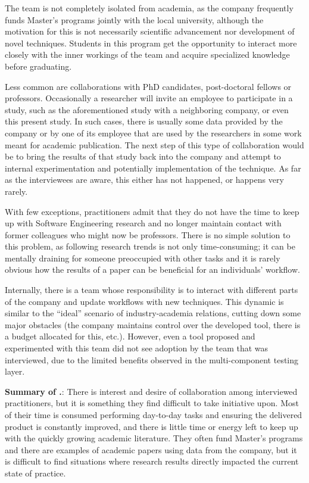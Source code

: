 The team is not completely isolated from academia, as the company frequently funds Master's programs jointly with the local university, although the motivation for this is not necessarily scientific advancement nor development of novel techniques.
Students in this program get the opportunity to interact more closely with the inner workings of the team and acquire specialized knowledge before graduating.

Less common are collaborations with PhD candidates, post-doctoral fellows or professors.
Occasionally a researcher will invite an employee to participate in a study, such as the aforementioned study with a neighboring company, or even this present study.
In such cases, there is usually some data provided by the company or by one of its employee that are used by the researchers in some work meant for academic publication.
The next step of this type of collaboration would be to bring the results of that study back into the company and attempt to internal experimentation and potentially implementation of the technique.
As far as the interviewees are aware, this either has not happened, or happens very rarely.

With few exceptions, practitioners admit that they do not have the time to keep up with Software Engineering research and no longer maintain contact with former colleagues who might now be professors.
There is no simple solution to this problem, as following research trends is not only time-consuming; it can be mentally draining for someone preoccupied with other tasks and it is rarely obvious how the results of a paper can be beneficial for an individuals' workflow.

Internally, there is a team whose responsibility is to interact with different parts of the company and update workflows with new techniques.
This dynamic is similar to the ``ideal'' scenario of industry-academia relations, cutting down some major obstacles (the company maintains control over the developed tool, there is a budget allocated for this, etc.).
However, even a tool proposed and experimented with this team did not see adoption by the team that was interviewed, due to the limited benefits observed in the multi-component testing layer.

\begin{tcolorbox}%
\textbf{Summary of .}: 
There is interest and desire of collaboration among interviewed practitioners, but it is something they find difficult to take initiative upon.
Most of their time is consumed performing day-to-day tasks and ensuring the delivered product is constantly improved, and there is little time or energy left to keep up with the quickly growing academic literature.
They often fund Master's programs and there are examples of academic papers using data from the company, but it is difficult to find situations where research results directly impacted the current state of practice.
\end{tcolorbox}
